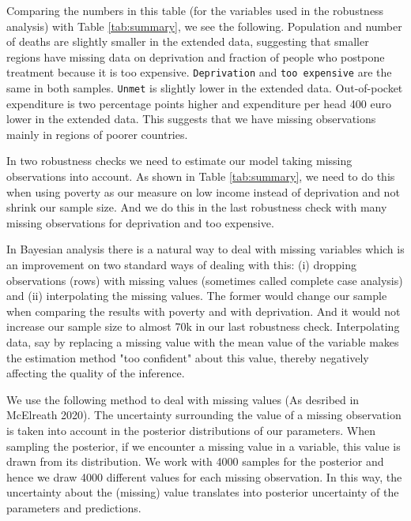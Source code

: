 \documentclass[a4paper,12pt]{article}
\makeatletter
\newcommand{\citeprocitem}[2]{\hyper@linkstart{cite}{citeproc_bib_item_#1}#2\hyper@linkend}
\makeatother
\begin{document}
Comparing the numbers in this table (for the variables used in the robustness analysis) with Table \ref{tab:summary}, we see the following. Population and number of deaths are slightly smaller in the extended data, suggesting that smaller regions have missing data on deprivation and fraction of people who postpone treatment because it is too expensive. \texttt{Deprivation} and \texttt{too expensive} are the same in both samples. \texttt{Unmet} is slightly lower in the extended data. Out-of-pocket expenditure is two percentage points higher and expenditure per head 400 euro lower in the extended data. This suggests that we have missing observations mainly in regions of poorer countries. 

In two robustness checks we need to estimate our model taking missing observations into account. As shown in Table \ref{tab:summary}, we need to do this when using poverty as our measure on low income instead of deprivation and not shrink our sample size. And we do this in the last robustness check with many missing observations for deprivation and too expensive.

In Bayesian analysis there is a natural way to deal with missing variables which is an improvement on two standard ways of dealing with this: (i) dropping observations (rows) with missing values (sometimes called complete case analysis) and (ii) interpolating the missing values. The former would change our sample when comparing the results with poverty and with deprivation. And it would not increase our sample size to almost 70k in our last robustness check. Interpolating data, say by replacing a missing value with the mean value of the variable makes the estimation method "too confident" about this value, thereby negatively affecting the quality of the inference.

We use the following method to deal with missing values (As desribed in \citeprocitem{19}{McElreath 2020}). The uncertainty surrounding the value of a missing observation is taken into account in the posterior distributions of our parameters. When sampling the posterior, if we encounter a missing value in a variable, this value is drawn from its distribution. We work with 4000 samples for the posterior and hence we draw 4000 different values for each missing observation. In this way, the uncertainty about the (missing) value translates into posterior uncertainty of the parameters and predictions.
\end{document}
